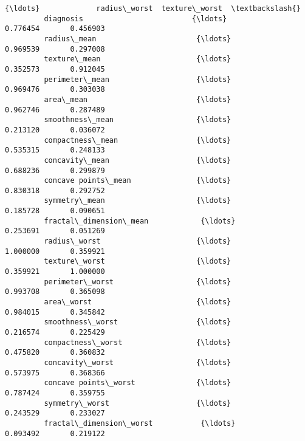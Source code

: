 \documentclass[11pt]{article}
\begin{document}
\begin{Verbatim}[commandchars=\\\{\}]
                                           {\ldots}             radius\_worst  texture\_worst  \textbackslash{}
         diagnosis                         {\ldots}                 0.776454       0.456903   
         radius\_mean                       {\ldots}                 0.969539       0.297008   
         texture\_mean                      {\ldots}                 0.352573       0.912045   
         perimeter\_mean                    {\ldots}                 0.969476       0.303038   
         area\_mean                         {\ldots}                 0.962746       0.287489   
         smoothness\_mean                   {\ldots}                 0.213120       0.036072   
         compactness\_mean                  {\ldots}                 0.535315       0.248133   
         concavity\_mean                    {\ldots}                 0.688236       0.299879   
         concave points\_mean               {\ldots}                 0.830318       0.292752   
         symmetry\_mean                     {\ldots}                 0.185728       0.090651   
         fractal\_dimension\_mean            {\ldots}                 0.253691       0.051269   
         radius\_worst                      {\ldots}                 1.000000       0.359921   
         texture\_worst                     {\ldots}                 0.359921       1.000000   
         perimeter\_worst                   {\ldots}                 0.993708       0.365098   
         area\_worst                        {\ldots}                 0.984015       0.345842   
         smoothness\_worst                  {\ldots}                 0.216574       0.225429   
         compactness\_worst                 {\ldots}                 0.475820       0.360832   
         concavity\_worst                   {\ldots}                 0.573975       0.368366   
         concave points\_worst              {\ldots}                 0.787424       0.359755   
         symmetry\_worst                    {\ldots}                 0.243529       0.233027   
         fractal\_dimension\_worst           {\ldots}                 0.093492       0.219122   
         

\end{Verbatim}
\end{document}
